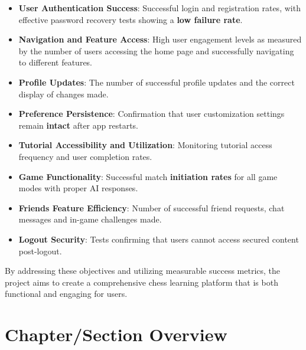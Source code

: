 \begin{itemize}
    \item \textbf{User Authentication Success}: Successful login and registration rates, with effective password recovery tests showing a \textbf{low failure rate}.
    \item \textbf{Navigation and Feature Access}: High user engagement levels as measured by the number of users accessing the home page and successfully navigating to different features.
    \item \textbf{Profile Updates}: The number of successful profile updates and the correct display of changes made.
    \item \textbf{Preference Persistence}: Confirmation that user customization settings remain \textbf{intact} after app restarts.
    \item \textbf{Tutorial Accessibility and Utilization}: Monitoring tutorial access frequency and user completion rates.
    \item \textbf{Game Functionality}: Successful match \textbf{initiation rates} for all game modes with proper AI responses.
    \item \textbf{Friends Feature Efficiency}: Number of successful friend requests, chat messages and in-game challenges made.
    \item \textbf{Logout Security}: Tests confirming that users cannot access secured content post-logout.
\end{itemize}

By addressing these objectives and utilizing measurable success metrics, the project aims to create a comprehensive chess learning platform that is both functional and engaging for users.

\section*{Chapter/Section Overview}

